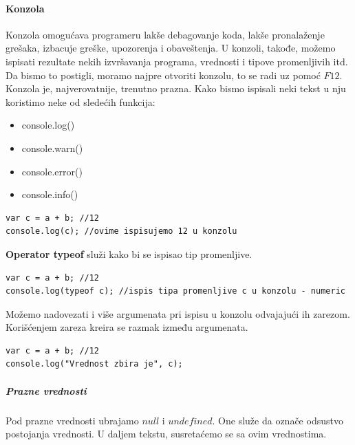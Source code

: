 \documentclass[a4paper]{article}
\begin{document}
\paragraph{Konzola}
Konzola omogućava programeru lakše debagovanje koda, lakše pronalaženje grešaka, izbacuje greške, upozorenja i obaveštenja.
U konzoli, takođe, možemo ispisati rezultate nekih izvršavanja programa, vrednosti i tipove promenljivih itd.\\
Da bismo to postigli, moramo najpre otvoriti konzolu, to se radi uz pomoć $F12$. Konzola je, najverovatnije, trenutno prazna. Kako bismo ispisali neki tekst u nju koristimo neke od sledećih funkcija:
\begin{itemize}
    \item console.log()
    \item console.warn()
    \item console.error()
    \item console.info()
\end{itemize}
\begin{lstlisting}[backgroundcolor = \color{lightgray}]
var c = a + b; //12
console.log(c); //ovime ispisujemo 12 u konzolu
\end{lstlisting}
\textbf{Operator typeof} služi kako bi se ispisao tip promenljive.
\begin{lstlisting}[backgroundcolor = \color{lightgray}]
var c = a + b; //12
console.log(typeof c); //ispis tipa promenljive c u konzolu - numeric
\end{lstlisting}
Možemo nadovezati i više argumenata pri ispisu u konzolu odvajajući ih zarezom. Korišćenjem zareza kreira se razmak između argumenata.
\begin{lstlisting}[backgroundcolor = \color{lightgray}]
var c = a + b; //12
console.log("Vrednost zbira je", c); 
\end{lstlisting}

\subparagraph{Prazne vrednosti}
Pod prazne vrednosti ubrajamo $null$ i $undefined$. One služe da označe odsustvo postojanja vrednosti. U daljem tekstu, susretaćemo se sa ovim vrednostima.
\end{document}
